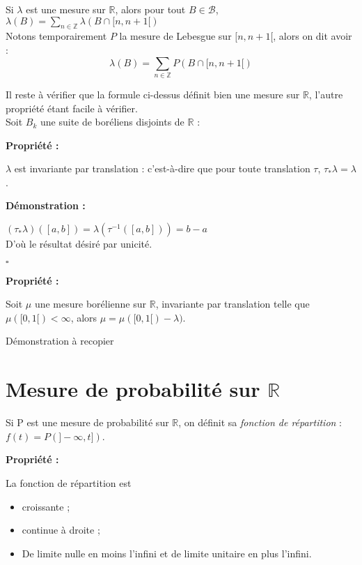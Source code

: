 \documentclass[10pt,a4paper,notitlepage ]{report}
\newcommand{\R}{\mathbb R}
\newcounter{th}
\newenvironment{propriete}[1][]{
	\begin{tcolorbox}
		\textbf{Propriété #1 : }
}
{\end{tcolorbox}}
\newenvironment{demo}[1][]{

	\textbf{Démonstration #1 :}
}{\begin{flushright}
	$\square$
\end{flushright}
}
\begin{document}
Si $\lambda $ est une mesure sur $\R$, alors pour tout $B \in \mathcal{B}$, $\lambda (B) = \sum \limits_{n \in \mathbb{Z} } \lambda (B \cap [n, n+1[ ) $ \\

Notons temporairement $P$ la mesure de Lebesgue sur $[n , n+1 [ $, alors on dit avoir :
\begin{equation*}
\lambda (B) = \sum \limits_{n \in \mathbb{Z} }P (B \cap [n, n+1[ )
\end{equation*}


Il reste à vérifier que la formule ci-dessus définit bien une mesure sur $\R$, l'autre propriété étant facile à vérifier. \\

Soit $B_k $ une suite de boréliens disjoints de $\R$ : 

\begin{propriete}

$\lambda$ est invariante par translation : c'est-à-dire que pour toute translation $\tau$, $\tau _* \lambda = \lambda $. 

\end{propriete}

\begin{demo}

$\left( \tau _* \lambda \right) \left( [a,b] \right)  = \lambda \left( \tau^{-1}  \left( [a,b] \right) \right) = b-a $ \\

D'où le résultat désiré par unicité.

\end{demo}

\begin{propriete}

Soit $\mu $ une mesure borélienne sur $\R$, invariante par translation telle que $\mu ([0,1[ )< \infty $, alors $\mu = \mu ([0,1[ ) - \lambda )$.

\end{propriete}

Démonstration à recopier

\section{Mesure de probabilité sur $\R$} 

Si P est une mesure de probabilité sur $\R$, on définit sa \emph{fonction de répartition} : $f(t) = P ( ]- \infty , t ] ) $.

\begin{propriete}

La fonction de répartition est 

\begin{itemize}
\item croissante ;
\item continue à droite ;
\item De limite nulle en moins l'infini et de limite unitaire en plus l'infini.
\end{itemize}

\end{propriete}
\end{document}
